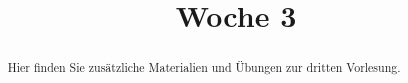 \documentclass{ximera}
\title{Woche 3}
\begin{document}
\begin{abstract}
Hier finden Sie zusätzliche Materialien und Übungen zur dritten Vorlesung.
\end{abstract}
\maketitle
\end{document}
